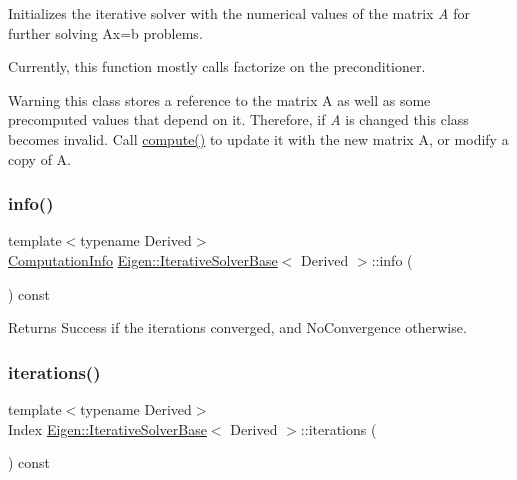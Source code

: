 Initializes the iterative solver with the numerical values of the matrix {\itshape A} for further solving {\ttfamily Ax=b} problems.

Currently, this function mostly calls factorize on the preconditioner.

\begin{DoxyWarning}{Warning}
this class stores a reference to the matrix A as well as some precomputed values that depend on it. Therefore, if {\itshape A} is changed this class becomes invalid. Call \mbox{\hyperlink{class_eigen_1_1_iterative_solver_base_a7dfa55c55e82d697bde227696a630914}{compute()}} to update it with the new matrix A, or modify a copy of A. 
\end{DoxyWarning}
\mbox{\label{class_eigen_1_1_iterative_solver_base_a0d6b459433a316b4f12d48e5c80d61fe}} 
\subsubsection{\texorpdfstring{info()}{info()}}
{\footnotesize\ttfamily template$<$typename Derived$>$ \\
\mbox{\hyperlink{group__enums_ga85fad7b87587764e5cf6b513a9e0ee5e}{Computation\+Info}} \mbox{\hyperlink{class_eigen_1_1_iterative_solver_base}{Eigen\+::\+Iterative\+Solver\+Base}}$<$ Derived $>$\+::info (\begin{DoxyParamCaption}{ }\end{DoxyParamCaption}) const\hspace{0.3cm}{\ttfamily [inline]}}

\begin{DoxyReturn}{Returns}
Success if the iterations converged, and No\+Convergence otherwise. 
\end{DoxyReturn}
\mbox{\label{class_eigen_1_1_iterative_solver_base_ae778dd098bd5e6655625b20b1e9f15da}} 
\subsubsection{\texorpdfstring{iterations()}{iterations()}}
{\footnotesize\ttfamily template$<$typename Derived$>$ \\
Index \mbox{\hyperlink{class_eigen_1_1_iterative_solver_base}{Eigen\+::\+Iterative\+Solver\+Base}}$<$ Derived $>$\+::iterations (\begin{DoxyParamCaption}{ }\end{DoxyParamCaption}) const\hspace{0.3cm}{\ttfamily [inline]}}

